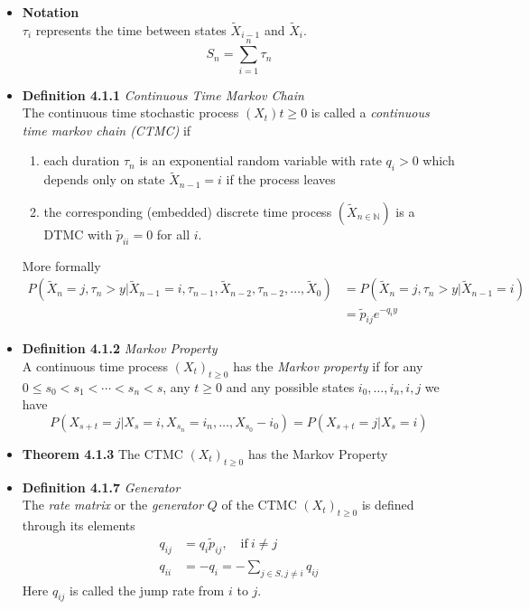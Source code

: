 \documentclass[11pt,a4paper]{article}
\begin{document}
\begin{itemize}
    \item \textbf{Notation} \\
        $\tau_i$ represents the time between states $\widetilde{X}_{i-1}$ and $\widetilde{X}_i$.
        \[
            S_n = \sum_{i=1}^n \tau_n
        \]

    \item \textbf{Definition 4.1.1} \emph{Continuous Time Markov Chain} \\
        The continuous time stochastic process $(X_t){t \geq 0}$ is called a
        \emph{continuous time markov chain (CTMC)} if

        \begin{enumerate}
            \item each duration $\tau_n$ is an exponential random variable with rate $q_i > 0$
                which depends only on state $\widetilde{X}_{n-1} = i$  if the process leaves
            \item the corresponding (embedded) discrete time process
                $(\widetilde{X}_{n \in \mathbb{N}})$ is a DTMC with $\widetilde{p}_{ii} = 0$
                for all $i$.
        \end{enumerate}

        More formally
        \begin{align*}{}
            P(\widetilde{X}_n = j, \tau_n > y | \widetilde{X}_{n-1} = i, \tau_{n-1},
            \widetilde{X}_{n-2}, \tau_{n-2}, \ldots, \widetilde{X}_0)
            &= P(\widetilde{X}_n = j, \tau_n > y | \widetilde{X}_{n-1} = i) \\
            &= \widetilde{p}_{ij} e^{-q_i y}
        \end{align*}

    \item \textbf{Definition 4.1.2} \emph{Markov Property} \\
        A continuous time process ${(X_t)}_{t \geq 0}$ has the \emph{Markov property} if
        for any $0 \leq s_0 < s_1 < \cdots < s_n < s$, any $t \geq 0$ and any possible states
        $i_0, \ldots, i_n, i, j$ we have
        \[
            P(X_{s+t} = j | X_s = i, X_{s_n} = i_n, \ldots, X_{s_0} - i_0) =
            P(X_{s+t} = j | X_s = i)
        \]

    \item \textbf{Theorem 4.1.3} The CTMC ${(X_t)}_{t \geq 0}$ has the Markov Property

    \item \textbf{Definition 4.1.7} \emph{Generator} \\
        The \emph{rate matrix} or the \emph{generator} $Q$ of the CTMC
        ${(X_t)}_{t\geq0}$ is defined through its elements
        \begin{align*}{}
            q_{ij} &= q_i \widetilde{p}_{ij}, \quad \text{if} \ i \neq j \\
            q_{ii} &= -q_i = - \sum_{j \in S, j \neq i} q_{ij}
        \end{align*}
        Here $q_{ij}$ is called the jump rate from $i$ to $j$.

\end{itemize}
\end{document}
